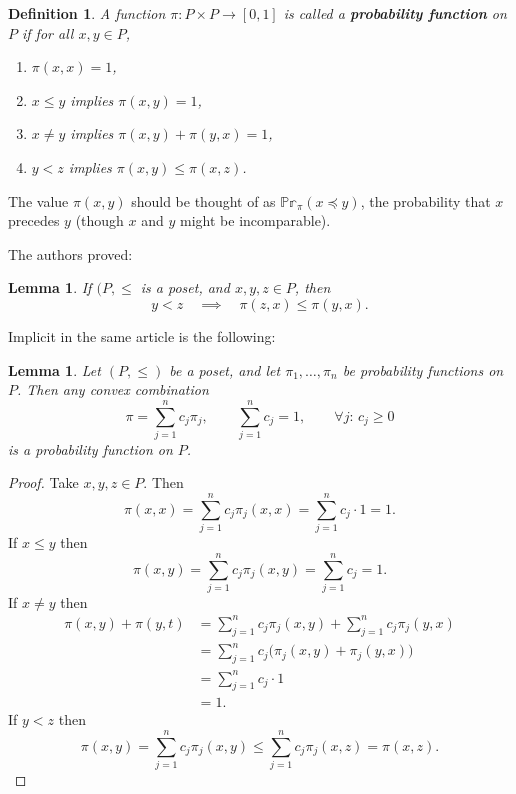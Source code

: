 \documentclass[11pt,a4paper,abstract=yes]{scrartcl}
\theoremstyle{plain}
\newtheorem{lemma}[theorem]{Lemma}
\newtheorem{definition}[theorem]{Definition}
\newcommand{\Prob}{\mathbb{Pr}}
\begin{document}
\begin{definition}
A function \(\pi: P \times P \to [0,1]\) is called a \textbf{probability function} on \(P\) if for all \(x,y \in P\),
\begin{enumerate}
\item \(\pi(x,x)=1\),
\item \(x \le y\) implies \(\pi(x,y)=1\),
\item \(x \neq y\) implies \(\pi(x,y) + \pi(y,x)=1\),
\item \(y < z\) implies \(\pi(x,y) \le \pi(x,z)\).
\end{enumerate}
\label{def-probfunc}
\end{definition}
The value \(\pi(x,y)\) should be thought of as \(\Prob_{\pi}(x \preceq y)\), the probability
that \(x\) precedes \(y\) (though \(x\) and \(y\) might be incomparable).

The authors proved:
\begin{lemma}
If \((P,\le\) is a poset, and \(x,y,z \in P\), then
\[
y < z \quad \implies \quad   \pi(z,x) \le \pi(y,x).
\]
\end{lemma}

Implicit in the same article is the following:
\begin{lemma}
Let \((P,\le)\) be a poset, and let \(\pi_{1},\dots,\pi_{n}\) be probability functions on \(P\).
Then any convex combination
\[
\pi = \sum_{j=1}^{n} c_{j}\pi_{j}, \qquad \sum_{j=1}^{n} c_{j} =1, \qquad \forall j: \, c_{j} \ge 0
\]
is a probability function on \(P\).
\label{lemma-isconvex}
\end{lemma}
\begin{proof}
Take \(x,y,z \in P\). Then
\[\pi(x,x) = \sum_{j=1}^{n}c_{j}\pi_{j}(x,x) = \sum_{j=1}^{n}c_{j}\cdot 1 = 1.
\]
If \(x \le y\) then
\[
\pi(x,y) = \sum_{j=1}^{n}c_{j}\pi_{j}(x,y) = \sum_{j=1}^{n}c_{j} = 1.
\]
If \(x \neq y\) then
\begin{align*}
\pi(x,y) + \pi(y,t)
& = \sum_{j=1}^{n}c_{j}\pi_{j}(x,y) + \sum_{j=1}^{n}c_{j}\pi_{j}(y,x) \\
& = \sum_{j=1}^{n}c_{j}\bigl(\pi_{j}(x,y) + \pi_{j}(y,x) \bigr) \\
& = \sum_{j=1}^{n}c_{j}\cdot 1 \\
& = 1.
\end{align*}
If \(y < z\) then
\[
\pi(x,y) = \sum_{j=1}^{n}c_{j}\pi_{j}(x,y)  \le \sum_{j=1}^{n}c_{j}\pi_{j}(x,z) = \pi(x,z).
\]
\end{proof}
\end{document}
